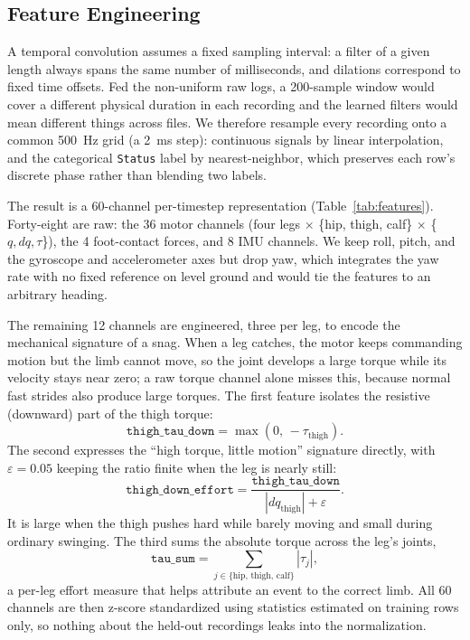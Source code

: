\subsection{Feature Engineering}
\label{sec:feat}

A temporal convolution assumes a fixed sampling interval: a filter of a given length always spans the same number of milliseconds, and dilations correspond to fixed time offsets. Fed the non-uniform raw logs, a 200-sample window would cover a different physical duration in each recording and the learned filters would mean different things across files. We therefore resample every recording onto a common 500~Hz grid (a 2~ms step): continuous signals by linear interpolation, and the categorical \texttt{Status} label by nearest-neighbor, which preserves each row's discrete phase rather than blending two labels.

The result is a 60-channel per-timestep representation (Table~\ref{tab:features}). Forty-eight are raw: the 36 motor channels (four legs $\times$ \{hip, thigh, calf\} $\times$ \{$q,dq,\tau$\}), the 4 foot-contact forces, and 8 IMU channels. We keep roll, pitch, and the gyroscope and accelerometer axes but drop yaw, which integrates the yaw rate with no fixed reference on level ground and would tie the features to an arbitrary heading.

The remaining 12 channels are engineered, three per leg, to encode the mechanical signature of a snag. When a leg catches, the motor keeps commanding motion but the limb cannot move, so the joint develops a large torque while its velocity stays near zero; a raw torque channel alone misses this, because normal fast strides also produce large torques. The first feature isolates the resistive (downward) part of the thigh torque:
\begin{equation}
\texttt{thigh\_tau\_down} = \max(0,\, -\tau_{\text{thigh}}).
\end{equation}
The second expresses the ``high torque, little motion'' signature directly, with $\varepsilon = 0.05$ keeping the ratio finite when the leg is nearly still:
\begin{equation}
\texttt{thigh\_down\_effort} = \frac{\texttt{thigh\_tau\_down}}{|dq_{\text{thigh}}| + \varepsilon}.
\end{equation}
It is large when the thigh pushes hard while barely moving and small during ordinary swinging. The third sums the absolute torque across the leg's joints,
\begin{equation}
\texttt{tau\_sum} = \sum_{j \in \{\text{hip},\,\text{thigh},\,\text{calf}\}} |\tau_j|,
\end{equation}
a per-leg effort measure that helps attribute an event to the correct limb. All 60 channels are then z-score standardized using statistics estimated on training rows only, so nothing about the held-out recordings leaks into the normalization.


